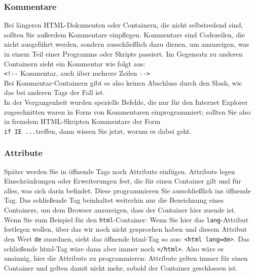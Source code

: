 \subsubsection{Kommentare}

Bei längeren HTML-Dokumenten oder Containern, die nicht selbstredend sind, sollten Sie außerdem Kommentare einpflegen. Kommentare sind Codezeilen, die nicht ausgeführt werden, sondern ausschließlich dazu dienen, um anzuzeigen, was in einem Teil einer Programms oder Skripts passiert. Im Gegensatz zu anderen Containern sieht ein Kommentar wie folgt aus:\\

\verb|<!--| Kommentar, auch über mehrere Zeilen \verb|-->|\\

Bei Kommentar-Containern gibt es also keinen Abschluss durch den Slash, wie das bei anderen Tags der Fall ist.\\

In der Vergangenheit wurden spezielle Befehle, die nur für den Internet Explorer zugeschnitten waren in Form von Kommentaren einprogrammiert; sollten Sie also in fremdem HTML-Skripten Kommentare der Form \\\verb|if IE ...|treffen, dann wissen Sie jetzt, worum es dabei geht.

\subsubsection{Attribute}

Später werden Sie in öffnende Tags noch Attribute einfügen. Attribute legen Einschränkungen oder Erweiterungen fest, die für einen Container gilt und für alles, was sich darin befindet. Diese programmieren Sie ausschließlich ins öffnende Tag. Das schließende Tag beinhaltet weiterhin nur die Bezeichnung eines Containers, um dem Browser anzuzeigen, dass der Container hier \glqq{}zuende\grqq{} ist.\\

Wenn Sie zum Beispiel für den \verb|html|-Container: Wenn Sie hier das \verb|lang|-Attribut festlegen wollen, über das wir noch nicht gesprochen haben und diesem Attribut den Wert \verb|de| zuordnen, sieht das öffnende html-Tag so aus: \verb|<html lang=de>|. Das schließende html-Tag wäre dann aber immer noch \verb|</html>|. Also wäre es unsinnig, hier die Attribute zu programmieren: Attribute gelten immer für einen Container und gelten damit nicht mehr, sobald der Container geschlossen ist.\\

